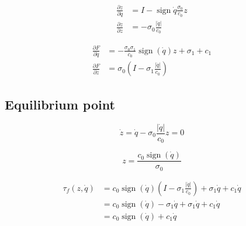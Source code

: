 \documentclass{paper}
\DeclareMathOperator*{\sign}{sign}
\begin{document}
\begin{equation}
\begin{aligned}
\frac{\partial z}{\partial \dot{q}}&=I-\sign{\dot{q}}\frac{\sigma_0}{c_0}z\\
\frac{\partial z}{\partial z}&=-\sigma_0\frac{|\dot{q}|}{c_0}
\end{aligned}
\end{equation}


\begin{equation}
\begin{aligned}
\frac{\partial F}{\partial \dot{q}}&=-\frac{\sigma_0\sigma_1}{c_0}\sign(\dot{q}) z +\sigma_1+c_1\\
\frac{\partial F}{\partial z}&=\sigma_0\left(I -\sigma_1 \frac{\left|\dot{q}\right|}{c_0}\right)
\end{aligned}
\end{equation}

\subsection{Equilibrium point}

\begin{equation}
\dot{z} = \dot{q} - \sigma_0 \frac{\left|\dot{q}\right|}{c_0} z=0
\end{equation}

\begin{equation}
z=\frac{c_0 \sign(\dot{q})}{\sigma_0}
\end{equation}

\begin{equation}
\begin{aligned}
\tau_{f}(z,\dot{q}) &= c_0\sign(\dot{q}) \left(I -\sigma_1 \frac{\left|\dot{q}\right|}{c_0}\right) + \sigma_1 \dot{q} + c_1\dot{q}\\
 &= c_0\sign(\dot{q}) -\sigma_1 \dot{q} + \sigma_1 \dot{q} + c_1\dot{q}\\
 &= c_0\sign(\dot{q}) + c_1\dot{q}
\end{aligned}
\end{equation}
\end{document}
